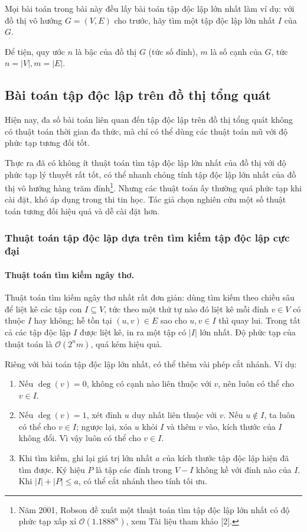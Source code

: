 \documentclass[11pt]{article}
\newcommand{\Oh}{\mathcal{O}}
\begin{document}
Mọi bài toán trong bài này đều lấy bài toán tập độc lập lớn nhất làm ví dụ:
với đồ thị vô hướng \(G=(V,E)\) cho trước, hãy tìm một tập độc lập lớn nhất
\(I\) của \(G\).

Để tiện, quy ước \(n\) là bậc của đồ thị \(G\) (tức số đỉnh), \(m\) là số cạnh
của \(G\), tức \(n=|V|,m=|E|\).

\subsection{Bài toán tập độc lập trên đồ thị tổng quát}

Hiện nay, đa số bài toán liên quan đến tập độc lập trên đồ thị tổng quát không
có thuật toán thời gian đa thức, mà chỉ có thể dùng các thuật toán mũ với độ
phức tạp tương đối tốt.

Thực ra đã có không ít thuật toán tìm tập độc lập lớn nhất của đồ thị với độ
phức tạp lý thuyết rất tốt, có thể nhanh chóng tính tập độc lập lớn nhất của
đồ thị vô hướng hàng trăm đỉnh\footnote{Năm 2001, Robson đề xuất một thuật
toán tìm tập độc lập lớn nhất có độ phức tạp xấp xỉ
\(\Oh(1.1888^n)\), xem Tài liệu tham khảo [2].}. Nhưng các thuật toán ấy
thường quá phức tạp khi cài đặt, khó áp dụng trong thi tin học. Tác giả chọn
nghiên cứu một số thuật toán tương đối hiệu quả và dễ cài đặt hơn.

\subsubsection{Thuật toán tập độc lập dựa trên tìm kiếm tập độc lập cực đại}

\paragraph{Thuật toán tìm kiếm ngây thơ.}
Thuật toán tìm kiếm ngây thơ nhất rất đơn giản: dùng tìm kiếm theo chiều sâu để
liệt kê các tập con \(I\subseteq V\), tức theo một thứ tự nào đó liệt kê mỗi
đỉnh \(v\in V\) có thuộc \(I\) hay không; hễ tồn tại \((u,v)\in E\) sao cho
\(u,v\in I\) thì quay lui. Trong tất cả các tập độc lập \(I\) được liệt kê, in
ra một tập có \(|I|\) lớn nhất. Độ phức tạp của thuật toán là \(\Oh(2^n m)\),
quá kém hiệu quả.

Riêng với bài toán tập độc lập lớn nhất, có thể thêm vài phép cắt nhánh. Ví dụ:

\begin{enumerate}
  \item Nếu \(\deg(v)=0\), không có cạnh nào liên thuộc với \(v\), nên luôn có
  thể cho \(v\in I\).

  \item Nếu \(\deg(v)=1\), xét đỉnh \(u\) duy nhất liên thuộc với \(v\). Nếu
  \(u\notin I\), ta luôn có thể cho \(v\in I\); ngược lại, xóa \(u\) khỏi \(I\)
  và thêm \(v\) vào, kích thước của \(I\) không đổi. Vì vậy luôn có thể cho
  \(v\in I\).

  \item Khi tìm kiếm, ghi lại giá trị lớn nhất \(a\) của kích thước tập độc lập
  hiện đã tìm được. Ký hiệu \(P\) là tập các đỉnh trong \(V-I\) không kề với
  đỉnh nào của \(I\). Khi \(|I|+|P|\le a\), có thể cắt nhánh theo tính tối ưu.
\end{enumerate}
\end{document}
